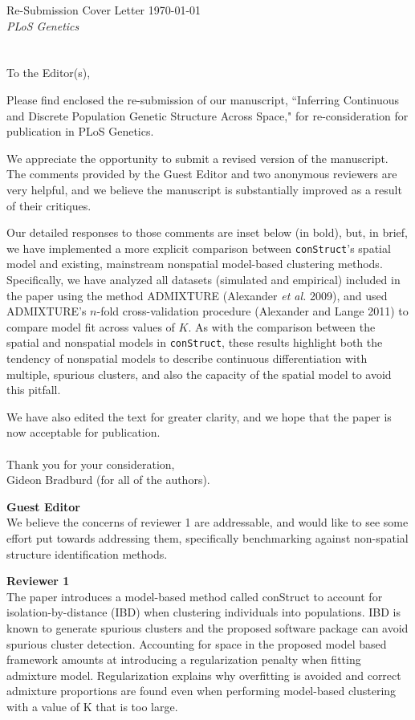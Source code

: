 \documentclass[11pt]{letter}
\begin{document}
Re-Submission Cover Letter \hfill	\today\\
\emph{PLoS Genetics}
\\\\\\
To the Editor(s),

Please find enclosed the re-submission of our manuscript, 
``Inferring Continuous and Discrete Population Genetic Structure Across Space,"
for re-consideration for publication in PLoS Genetics.

We appreciate the opportunity to submit a revised version of the manuscript.  
The comments provided by the Guest Editor 
and two anonymous reviewers are very helpful, 
and we believe the manuscript is substantially improved as a result 
of their critiques.

Our detailed responses to those comments are inset below (in bold), 
but, in brief, we have implemented a more explicit comparison between 
\texttt{conStruct}'s spatial model and existing, mainstream nonspatial model-based clustering methods.
Specifically, we have analyzed all datasets (simulated and empirical) 
included in the paper using the method ADMIXTURE (Alexander \textit{et al.} 2009),
and used ADMIXTURE's $n$-fold cross-validation procedure (Alexander and Lange 2011)
to compare model fit across values of $K$.
As with the comparison between the spatial and nonspatial models in \texttt{conStruct}, 
these results highlight both the tendency of nonspatial models 
to describe continuous differentiation with multiple, spurious clusters, 
and also the capacity of the spatial model to avoid this pitfall.

We have also edited the text for greater clarity, and we hope that the paper is now acceptable for publication.\\\\
%
Thank you for your consideration,\\
Gideon Bradburd (for all of the authors).

\newpage

\textbf{Guest Editor}\\
We believe the concerns of reviewer 1 are addressable, and would like to see some effort put towards addressing them, specifically benchmarking against non-spatial structure identification methods.

\textbf{Reviewer 1}\\
The paper introduces a model-based method called conStruct to account for isolation-by-distance (IBD) when clustering individuals into populations. IBD is known to generate spurious clusters and the proposed software package can avoid spurious cluster detection. Accounting for space in the proposed model based framework amounts at introducing a regularization penalty when fitting admixture model. Regularization explains why overfitting is avoided and correct admixture proportions are found even when performing model-based clustering with a value of K that is too large.
\end{document}
